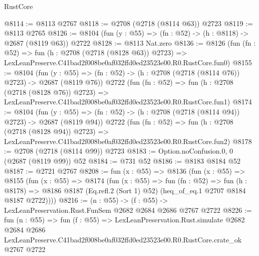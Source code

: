 \begin{lexlean}{RustCore}
\begin{coremodule}
@8114 := @8113 @2767
@8118 := @2708 (@2718 (@8114 @63)) @2723
@8119 := @8113 @2765
@8126 := @8104 (fun (y : @55) => (fn : @52) -> (h : @8118) -> @2687 (@8119 @63)) @2722
@8128 := @8113 Nat.zero
@8136 := @8126
    (fun (fn : @52) =>
    fun (h : @2708 (@2718 (@8128 @63)) @2723) =>
    LexLeanPreserve.C41bad2f008be0af032ffd0ed23523e00.R0.RustCore.fun0)
@8155 := @8104
    (fun (y : @55) => (fn : @52) -> (h : @2708 (@2718 (@8114 @76)) @2723) -> @2687 (@8119 @76))
    @2722
    (fun (fn : @52) =>
    fun (h : @2708 (@2718 (@8128 @76)) @2723) =>
    LexLeanPreserve.C41bad2f008be0af032ffd0ed23523e00.R0.RustCore.fun1)
@8174 := @8104
    (fun (y : @55) => (fn : @52) -> (h : @2708 (@2718 (@8114 @94)) @2723) -> @2687 (@8119 @94))
    @2722
    (fun (fn : @52) =>
    fun (h : @2708 (@2718 (@8128 @94)) @2723) =>
    LexLeanPreserve.C41bad2f008be0af032ffd0ed23523e00.R0.RustCore.fun2)
@8178 := @2708 (@2718 (@8114 @99)) @2723
@8183 := Option.noConfusion.{0, 0} (@2687 (@8119 @99)) @52
@8184 := @731 @52
@8186 := @8183 @8184 @52
@8187 := @2721 @2767
@8208 := fun (x : @55) =>
  @8136
    (fun (x : @55) =>
    @8155
      (fun (x : @55) =>
      @8174
        (fun (x : @55) =>
        fun (fn : @52) =>
        fun (h : @8178) =>
        @8186 @8187 (Eq.refl.{2} (Sort 1) @52) (heq_of_eq.{1} @2707 @8184 @8187 @2722))))
@8216 := (n : @55) -> (f : @55) -> LexLeanPreservation.Rust.FunSem @2682 @2684 @2686 @2767 @2722
@8226 := fun (n : @55) =>
  fun (f : @55) =>
  LexLeanPreservation.Rust.simulate
    @2682
    @2684
    @2686
    LexLeanPreserve.C41bad2f008be0af032ffd0ed23523e00.R0.RustCore.crate_ok
    @2767
    @2722
\end{coremodule}
\end{lexlean}
